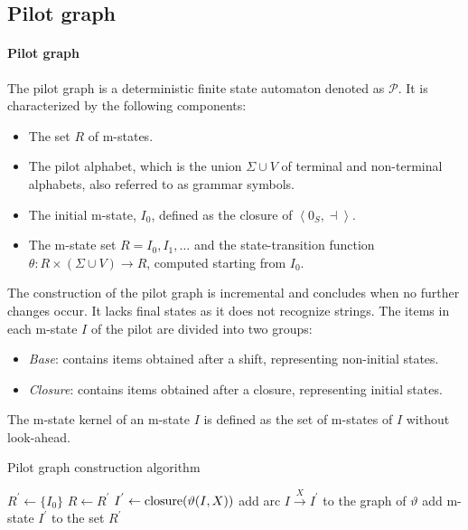 \subsection{Pilot graph}
\paragraph*{Pilot graph}
The pilot graph is a deterministic finite state automaton denoted as $\mathcal{P}$. 
It is characterized by the following components:
\begin{itemize}
    \item The set $R$ of m-states. 
    \item The pilot alphabet, which is the union $\Sigma\cup V$ of terminal and non-terminal alphabets, also referred to as grammar symbols.
    \item The initial m-state, $I_0$, defined as the closure of $\left\langle 0_S, \dashv \right\rangle$.
    \item The m-state set $R={I_0,I_1,\dots}$ and the state-transition function $\theta:R \times (\Sigma \cup V) \rightarrow R$, computed starting from $I_0$. 
\end{itemize}
The construction of the pilot graph is incremental and concludes when no further changes occur.
It lacks final states as it does not recognize strings.
The items in each m-state $I$ of the pilot are divided into two groups:
\begin{itemize}
    \item \textit{Base}: contains items obtained after a shift, representing non-initial states.
    \item \textit{Closure}: contains items obtained after a closure, representing initial states.
\end{itemize}
\begin{definition}
    The m-state kernel of an m-state $I$ is defined as the set of m-states of $I$ without look-ahead.
\end{definition}
\begin{algorithm}[H]
    \caption{Pilot graph construction algorithm}
        \begin{algorithmic}[1]
            \State $R^{'} \leftarrow \{I_0\}$
                \State $R \leftarrow R^{'}$
                    \State $I^{'} \leftarrow \textnormal{closure}(\vartheta(I,X))$
                        \State add arc $I \overset{X}{\rightarrow} I^{'}$ to the graph of $\vartheta$
                            \State add m-state $I^{'}$ to the set $R^{'}$
                        \EndIf
                    \EndIf
                \EndFor
            \EndWhile
        \end{algorithmic}
\end{algorithm}
